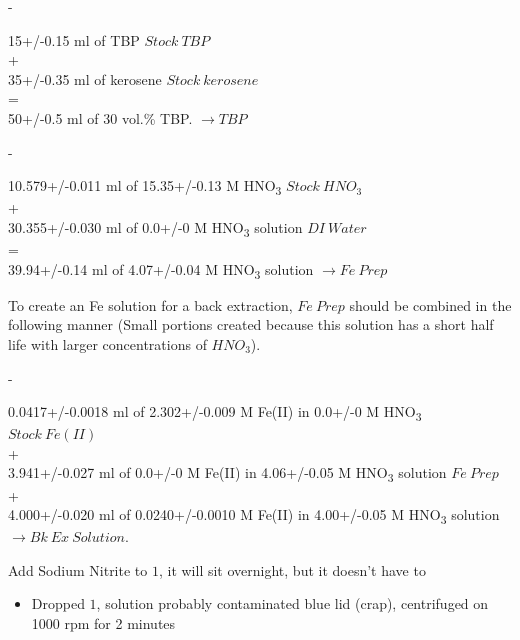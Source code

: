 \documentclass[idxtotoc,hyperref,openany,oneside]{labbook} %
\newcommand{\cmark}{\ding{51}}%
\newcommand{\done}{\rlap{$\square$}{\raisebox{2pt}{\large\hspace{1pt}\cmark}}%
  \hspace{-2.5pt}}
\newcommand{\tsbs}{\textsubscript}
\begin{document}
\begin{todolist}
\item[\done]{-}
\end{todolist}
\begin{center}
15+/-0.15 ml of TBP $\boxed{Stock\ TBP}$\\
+\\
35+/-0.35 ml of kerosene $\boxed{Stock\ kerosene}$\\
=\\
50+/-0.5 ml of 30 vol.\% TBP.
$\boxed{\rightarrow TBP}$
\end{center}

\begin{todolist}
\item[\done]{-}
\end{todolist}
\begin{center}
10.579+/-0.011 ml of 15.35+/-0.13 M HNO\tsbs{3} $\boxed{Stock\ HNO_3}$\\
+\\
30.355+/-0.030 ml of 0.0+/-0 M HNO\tsbs{3} solution $\boxed{DI\ Water}$\\
=\\
39.94+/-0.14 ml of 4.07+/-0.04 M HNO\tsbs{3} solution
$\boxed{\rightarrow Fe\ Prep}$
\end{center}

To create an Fe solution for a back extraction, $\boxed{Fe\ Prep}$ should be
combined in the following manner (Small portions created because this
solution has a short half life with larger concentrations of $HNO_3$).

\begin{todolist}
\item{-}
\end{todolist}
\begin{center}
0.0417+/-0.0018 ml of 2.302+/-0.009 M Fe(II) in 0.0+/-0 M HNO\tsbs{3} $\boxed{Stock\ Fe(II)}$\\
+\\
3.941+/-0.027 ml of 0.0+/-0 M Fe(II) in 4.06+/-0.05 M HNO\tsbs{3} solution $\boxed{Fe\ Prep}$\\
+\\
4.000+/-0.020 ml of 0.0240+/-0.0010 M Fe(II) in 4.00+/-0.05 M HNO\tsbs{3} solution $\boxed{\rightarrow Bk\ Ex\ Solution}$.
\end{center}

\begin{todolist}
\item[\done]{Add Sodium Nitrite to $\boxed{1}$, it will sit overnight,
but it doesn't have to}
  \begin{itemize}
  \item{Dropped $\boxed{1}$, solution probably contaminated blue lid
    (crap), centrifuged on 1000 rpm for 2 minutes}
  \end{itemize}
\end{todolist}
\end{document}
